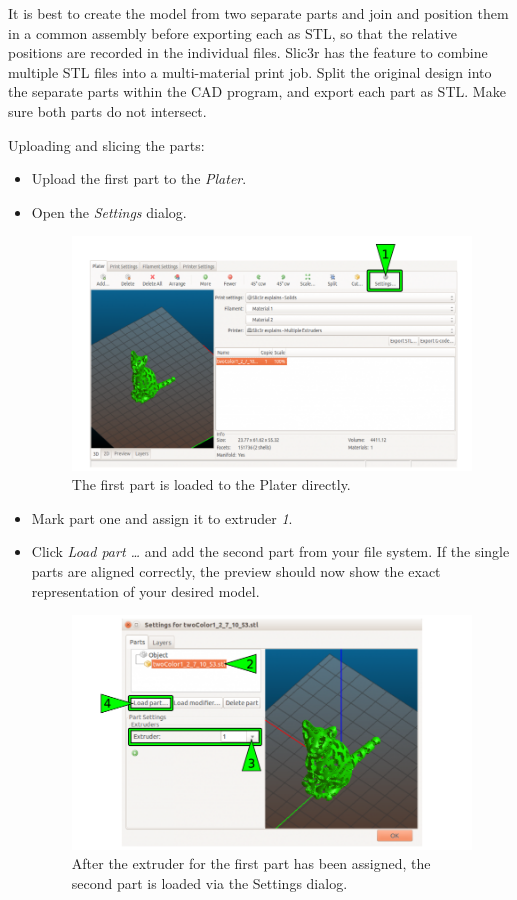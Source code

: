 It is best to create the model from two separate parts and join and position them in a common assembly before exporting each as STL, so that the relative positions are recorded in the individual files. Slic3r has the feature to combine multiple STL files into a multi-material print job. Split the original design into the separate parts within the CAD program, and export each part as STL. Make sure both parts do not intersect. 

Uploading and slicing the parts: 

\begin{itemize}
  \item Upload the first part to the \emph{Plater}.
  \item Open the \emph{Settings} dialog.
 
  \begin{figure}[H]
    \centering
    \includegraphics[width=.7\linewidth]{./img/slic3r_bicolored_cat1.png}
    \caption{The first part is loaded to the Plater directly.}
  \end{figure}
  
  \item Mark part one and assign it to extruder \emph{1}.
  \item Click \emph{Load part …} and add the second part from your file system.
        If the single parts are aligned correctly, the preview should now show the exact representation of your desired model.

  \begin{figure}[H]
    \centering
    \includegraphics[width=.7\linewidth]{./img/slic3r_bicolored_cat2.png}
    \caption{After the extruder for the first part has been assigned, 
             the second part is loaded via the Settings dialog.}
  \end{figure}


\end{itemize}
